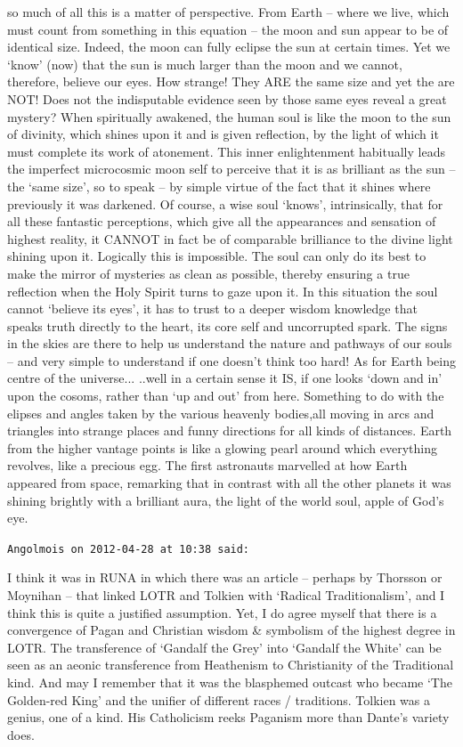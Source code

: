 \begin{footnotesize}
\begin{sffamily}
so much of all this is a matter of perspective. From Earth -- where we live, which must count from something in this equation -- the moon and sun appear to be of identical size. Indeed, the moon can fully eclipse the sun at certain times. Yet we `know' (now) that the sun is much larger than the moon and we cannot, therefore, believe our eyes. How strange! They ARE the same size and yet the are NOT! Does not the indisputable evidence seen by those same eyes reveal a great mystery? When spiritually awakened, the human soul is like the moon to the sun of divinity, which shines upon it and is given reflection, by the light of which it must complete its work of atonement. This inner enlightenment habitually leads the imperfect microcosmic moon self to perceive that it is as brilliant as the sun -- the `same size', so to speak -- by simple virtue of the fact that it shines where previously it was darkened. Of course, a wise soul `knows', intrinsically, that for all these fantastic perceptions, which give all the appearances and sensation of highest reality, it CANNOT in fact be of comparable brilliance to the divine light shining upon it. Logically this is impossible. The soul can only do its best to make the mirror of mysteries as clean as possible, thereby ensuring a true reflection when the Holy Spirit turns to gaze upon it. In this situation the soul cannot `believe its eyes', it has to trust to a deeper wisdom knowledge that speaks truth directly to the heart, its core self and uncorrupted spark. The signs in the skies are there to help us understand the nature and pathways of our souls -- and very simple to understand if one doesn't think too hard! As for Earth being centre of the universe... ..well in a certain sense it IS, if one looks `down and in' upon the cosoms, rather than `up and out' from here. Something to do with the elipses and angles taken by the various heavenly bodies,all moving in arcs and triangles into strange places and funny directions for all kinds of distances. Earth from the higher vantage points is like a glowing pearl around which everything revolves, like a precious egg. The first astronauts marvelled at how Earth appeared from space, remarking that in contrast with all the other planets it was shining brightly with a brilliant aura, the light of the world soul, apple of God's eye.

\hfill

\texttt{Angolmois on 2012-04-28 at 10:38 said:}

I think it was in RUNA in which there was an article -- perhaps by Thorsson or Moynihan -- that linked LOTR and Tolkien with `Radical Traditionalism', and I think this is quite a justified assumption. Yet, I do agree myself that there is a convergence of Pagan and Christian wisdom \& symbolism of the highest degree in LOTR. The transference of `Gandalf the Grey' into `Gandalf the White' can be seen as an aeonic transference from Heathenism to Christianity of the Traditional kind. And may I remember that it was the blasphemed outcast who became `The Golden-red King' and the unifier of different races / traditions. Tolkien was a genius, one of a kind. His Catholicism reeks Paganism more than Dante's variety does.


\end{sffamily}
\end{footnotesize}
